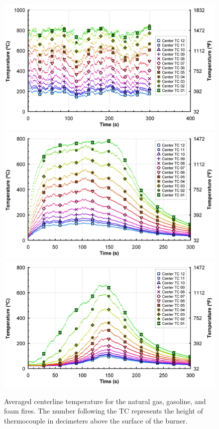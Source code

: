 \documentclass[twoside]{uocthesis}
\begin{document}
{{\begin{figure}[p]
  \centering
  \includegraphics[width=4.5in]{../Figures/Fig6}\\
  \includegraphics[width=4.5in]{../Figures/Fig7}\\
  \includegraphics[width=4.5in]{../Figures/Fig8}\\
  \caption[Averaged centerline temperature for the natural gas, gasoline, and foam fires]{Averaged centerline temperature for the natural gas, gasoline, and foam fires. The number following the TC represents the height of thermocouple in decimeters  above the surface of the burner.}
  \label{Temp}
\end{figure}


}}
\end{document}
